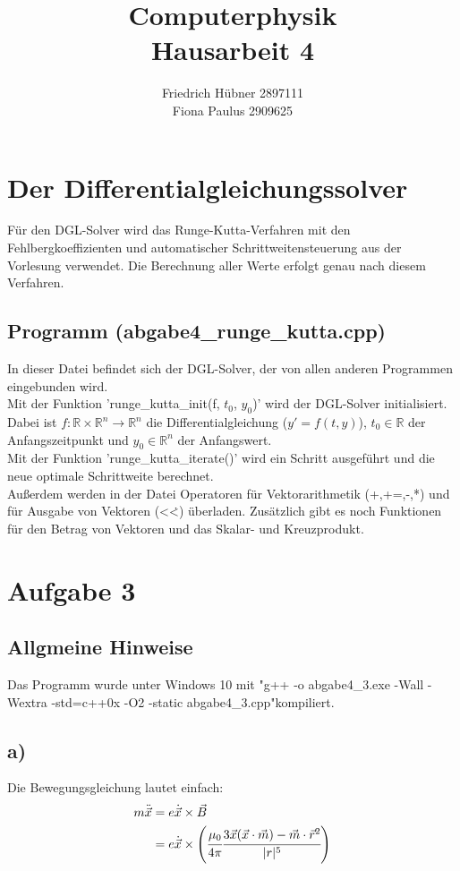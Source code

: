 \documentclass{scrreprt}
\author{Friedrich Hübner 2897111\\
Fiona Paulus 2909625}
\title{Computerphysik\\Hausarbeit 4}
\begin{document}
\maketitle
\newpage

\chapter*{Der Differentialgleichungssolver}
Für den DGL-Solver wird das Runge-Kutta-Verfahren mit den Fehlbergkoeffizienten und automatischer Schrittweitensteuerung aus der Vorlesung verwendet. Die Berechnung aller Werte erfolgt genau nach diesem Verfahren.

\section*{Programm (abgabe4\_runge\_kutta.cpp)}
In dieser Datei befindet sich der DGL-Solver, der von allen anderen Programmen eingebunden wird.\\

Mit der Funktion 'runge\_kutta\_init(f, $t_0$, $y_0$)' wird der DGL-Solver initialisiert. Dabei ist $f: \mathbb{R} \times \mathbb{R}^n \to \mathbb{R}^n$ die Differentialgleichung ($y' = f(t,y)$), $t_0 \in \mathbb{R}$ der Anfangszeitpunkt und $y_0 \in \mathbb{R}^n$ der Anfangswert.\\

Mit der Funktion 'runge\_kutta\_iterate()' wird ein Schritt ausgeführt und die neue optimale Schrittweite berechnet.\\

Außerdem werden in der Datei Operatoren für Vektorarithmetik (+,+=,-,*) und für Ausgabe von Vektoren (<\.<) überladen. Zusätzlich gibt es noch Funktionen für den Betrag von Vektoren und das Skalar- und Kreuzprodukt.  

\chapter*{Aufgabe 3}
\section*{Allgmeine Hinweise}
Das Programm wurde unter Windows 10 mit "g++ -o abgabe4\_3.exe -Wall -Wextra -std=c++0x -O2 -static abgabe4\_3.cpp"\;kompiliert.

\section*{a)}
Die Bewegungsgleichung lautet einfach:
\begin{align}
m\ddot{\vec{x}} &= e\dot{\vec{x}} \times \vec{B}\\
				&= e\dot{\vec{x}} \times \left(\cfrac{\mu_0}{4\pi}\cfrac{3\vec{x}(\vec{x} \cdot \vec{m}) - \vec{m}\cdot\vec{r}^2}{|r|^5}\right)  
\end{align}
\end{document}
